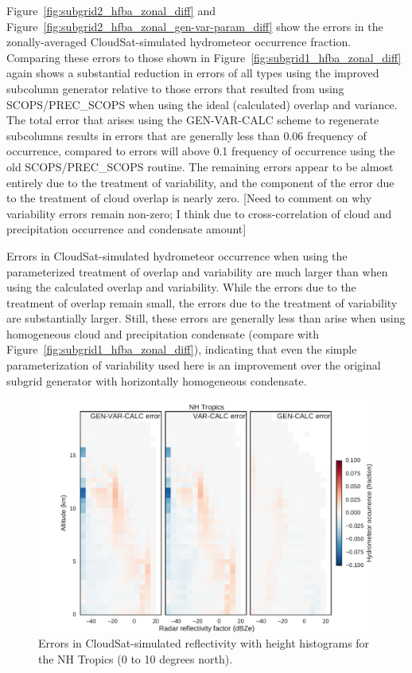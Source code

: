 Figure~\ref{fig:subgrid2_hfba_zonal_diff} and
Figure~\ref{fig:subgrid2_hfba_zonal_gen-var-param_diff} show the errors
in the zonally-averaged CloudSat-simulated hydrometeor occurrence
fraction. Comparing these errors to those shown in
Figure~\ref{fig:subgrid1_hfba_zonal_diff} again shows a substantial
reduction in errors of all types using the improved subcolumn generator
relative to those errors that resulted from using SCOPS/PREC\_SCOPS when
using the ideal (calculated) overlap and variance. The total error that
arises using the GEN-VAR-CALC scheme to regenerate subcolumns results in
errors that are generally less than 0.06 frequency of occurrence,
compared to errors will above 0.1 frequency of occurrence using the old
SCOPS/PREC\_SCOPS routine. The remaining errors appear to be almost
entirely due to the treatment of variability, and the component of the
error due to the treatment of cloud overlap is nearly zero. {[}Need to
comment on why variability errors remain non-zero; I think due to
cross-correlation of cloud and precipitation occurrence and condensate
amount{]}

Errors in CloudSat-simulated hydrometeor occurrence when using the
parameterized treatment of overlap and variability are much larger than
when using the calculated overlap and variability. While the errors due
to the treatment of overlap remain small, the errors due to the
treatment of variability are substantially larger. Still, these errors
are generally less than arise when using homogeneous cloud and
precipitation condensate (compare with
Figure~\ref{fig:subgrid1_hfba_zonal_diff}), indicating that even the
simple parameterization of variability used here is an improvement over
the original subgrid generator with horizontally homogeneous condensate.

\begin{figure}[htbp]
\centering
\includegraphics{graphics/subgrid2_cfadDbze94_NHTropics_gen-var-calc_diff.pdf}
\caption{\label{fig:subgrid2_cfadDbze94_nhtropics_diff}Errors in
CloudSat-simulated reflectivity with height histograms for the NH
Tropics (0 to 10 degrees
north).}\label{fig:subgrid2ux5fcfadDbze94ux5fnhtropicsux5fdiff}
\end{figure}

